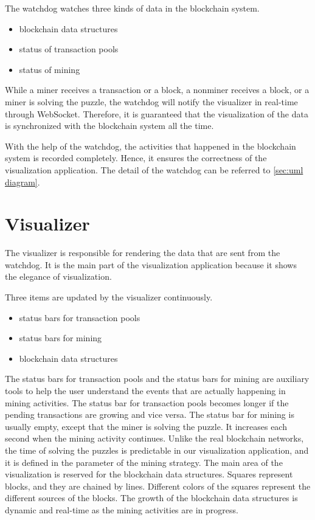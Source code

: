 The watchdog watches three kinds of data in the blockchain system.

\begin{itemize}
    \item blockchain data structures
    \item status of transaction pools
    \item status of mining
\end{itemize}

While a miner receives a transaction or a block, a nonminer receives a block, or a miner is solving the puzzle, the watchdog will notify the visualizer in real-time through WebSocket. Therefore, it is guaranteed that the visualization of the data is synchronized with the blockchain system all the time.

With the help of the watchdog, the activities that happened in the blockchain system is recorded completely. Hence, it ensures the correctness of the visualization application. The detail of the watchdog can be referred to \ref{sec:uml diagram}.

\section{Visualizer}

The visualizer is responsible for rendering the data that are sent from the watchdog. It is the main part of the visualization application because it shows the elegance of visualization. 

Three items are updated by the visualizer continuously.

\begin{itemize}
    \item status bars for transaction pools
    \item status bars for mining
    \item blockchain data structures
\end{itemize}

The status bars for transaction pools and the status bars for mining are auxiliary tools to help the user understand the events that are actually happening in mining activities. The status bar for transaction pools becomes longer if the pending transactions are growing and vice versa. The status bar for mining is usually empty, except that the miner is solving the puzzle. It increases each second when the mining activity continues. Unlike the real blockchain networks, the time of solving the puzzles is predictable in our visualization application, and it is defined in the parameter of the mining strategy. The main area of the visualization is reserved for the blockchain data structures. Squares represent blocks, and they are chained by lines. Different colors of the squares represent the different sources of the blocks. The growth of the blockchain data structures is dynamic and real-time as the mining activities are in progress.

